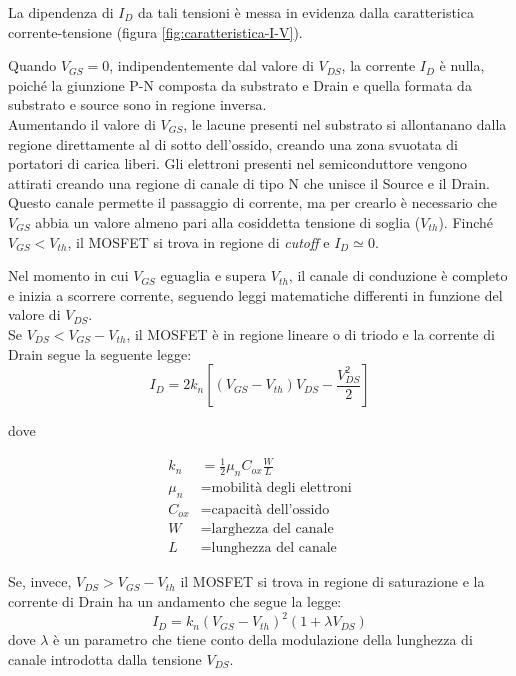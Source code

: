 La dipendenza di $I_D$ da tali tensioni è messa in evidenza dalla caratteristica corrente-tensione (figura \ref{fig:caratteristica-I-V}).

Quando $V_{GS} = 0$, indipendentemente dal valore di $V_{DS}$, la corrente $I_D$ è nulla, poiché la giunzione P-N composta da substrato e Drain e quella formata da substrato e source sono in regione inversa. \\
Aumentando il valore di $V_{GS}$, le lacune presenti nel substrato si allontanano dalla regione direttamente al di sotto dell'ossido, creando una
zona svuotata di portatori di carica liberi. Gli elettroni presenti nel semiconduttore
vengono attirati creando una regione di canale di tipo N che unisce il
Source e il Drain. Questo canale permette il passaggio di corrente, ma per crearlo è necessario che $V_{GS}$ abbia un valore almeno pari alla cosiddetta tensione di soglia ($V_{th}$). Finché $V_{GS} < V_{th}$, il MOSFET si trova in regione di \emph{cutoff} e $I_D \simeq 0$.

Nel momento in cui $V_{GS}$ eguaglia e supera $V_{th}$, il canale di conduzione è completo e inizia a scorrere corrente, seguendo leggi matematiche differenti in funzione del valore di $V_{DS}$.\\

Se $V_{DS} < V_{GS} -  V_{th}$, il MOSFET è in regione lineare o di triodo e la corrente di Drain segue la seguente legge:\\

\begin{equation}
  I_D = 2k_n\left[ \left(V_{GS}-V_{th}\right)V_{DS} - \frac{V_{DS}^2}{2}\right]
\end{equation}

dove

\begin{align*}
   k_n &= \frac{1}{2}\mu_n C_{ox}\frac{W}{L} \\
   \mu_n &= \text{mobilità degli elettroni} \\
   C_{ox} &= \text{capacità dell'ossido} \\
   W &= \text{larghezza del canale} \\
   L &= \text{lunghezza del canale}
\end{align*}

Se, invece, $V_{DS} > V_{GS} -  V_{th}$ il MOSFET si trova in regione di saturazione e la corrente di Drain ha un andamento che segue la legge:\\
\begin{equation}
  I_D = k_n\left(V_{GS}-V_{th}\right)^2 (1+\lambda V_{DS})
\end{equation}
dove $\lambda$ è un parametro che tiene conto della modulazione della lunghezza di canale introdotta dalla tensione $V_{DS}$.\\

